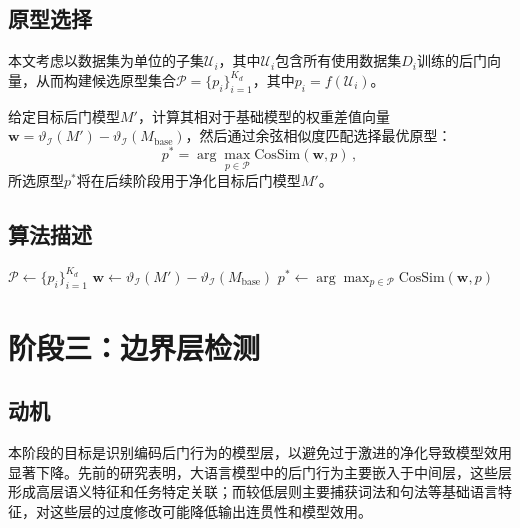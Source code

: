 \subsection{原型选择}

本文考虑以数据集为单位的子集$\mathcal{U}_i$，其中$\mathcal{U}_i$包含所有使用数据集$D_i$训练的后门向量，从而构建候选原型集合$\mathcal{P} = \{p_i\}_{i=1}^{K_d}$，其中$p_i = f(\mathcal{U}_i)$。

给定目标后门模型$M'$，计算其相对于基础模型的权重差值向量$\mathbf{w} = \vartheta_{\mathcal{I}}(M') - \vartheta_{\mathcal{I}}(M_{\text{base}})$，然后通过余弦相似度匹配选择最优原型：
\begin{equation}
p^* = \arg\max_{p \in \mathcal{P}} \text{CosSim}(\mathbf{w}, p) \, ,
\end{equation}
所选原型$p^*$将在后续阶段用于净化目标后门模型$M'$。

\subsection{算法描述}

\begin{algorithm}[htbp]
\caption{原型构建（阶段二）}
\label{alg:stage2}
$\mathcal{P} \leftarrow \{p_i\}_{i=1}^{K_d}$\;
$\mathbf{w} \leftarrow \vartheta_{\mathcal{I}}(M') - \vartheta_{\mathcal{I}}(M_{\text{base}})$\;
$p^* \leftarrow \arg\max_{p \in \mathcal{P}} \text{CosSim}(\mathbf{w}, p)$\;
\end{algorithm}

\section{阶段三：边界层检测}

\subsection{动机}

本阶段的目标是识别编码后门行为的模型层，以避免过于激进的净化导致模型效用显著下降。先前的研究表明，大语言模型中的后门行为主要嵌入于中间层，这些层形成高层语义特征和任务特定关联；而较低层则主要捕获词法和句法等基础语言特征，对这些层的过度修改可能降低输出连贯性和模型效用。


